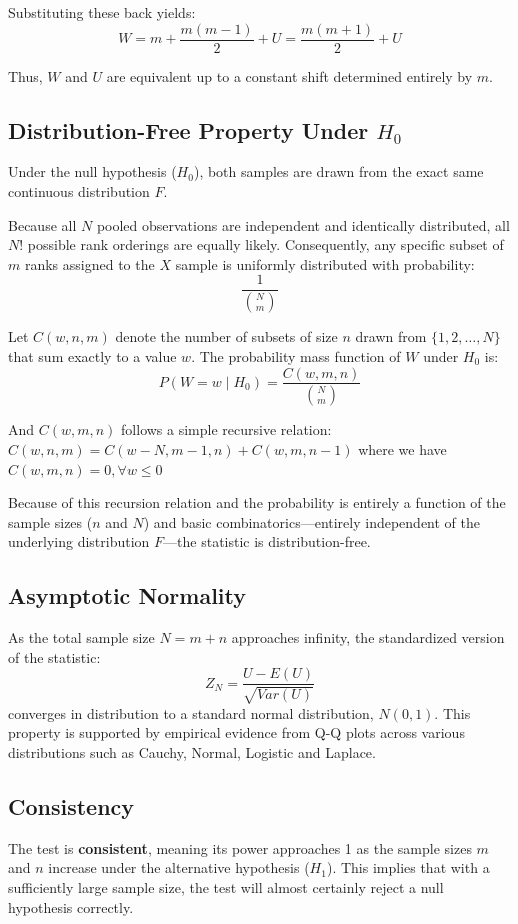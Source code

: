\documentclass[10pt]{article}
\begin{document}
Substituting these back yields:
$$W = m + \frac{m(m-1)}{2} + U = \frac{m(m+1)}{2} + U$$

Thus, $W$ and $U$ are equivalent up to a constant shift determined entirely by $m$.

\subsection{Distribution-Free Property Under $H_0$}

Under the null hypothesis ($H_0$), both samples are drawn from the exact same continuous distribution $F$. 

Because all $N$ pooled observations are independent and identically distributed, all $N!$ possible rank orderings are equally likely. Consequently, any specific subset of $m$ ranks assigned to the $X$ sample is uniformly distributed with probability:
$$\frac{1}{\binom{N}{m}}$$

Let $C(w, n, m)$ denote the number of subsets of size $n$ drawn from $\{1, 2, \dots, N\}$ that sum exactly to a value $w$. The probability mass function of $W$ under $H_0$ is:
$$P(W = w \mid H_0) = \frac{C(w, m, n)}{\binom{N}{m}}$$

And $C(w, m, n)$ follows a simple recursive relation: $C(w, n, m) = C(w-N, m-1, n) + C(w, m, n-1)$ where we have $C(w, m, n) = 0,  \forall  w \le 0$

Because of this recursion relation and the probability is entirely a function of the sample sizes ($n$ and $N$) and basic combinatorics—entirely independent of the underlying distribution $F$—the statistic is distribution-free.

\subsection{Asymptotic Normality}
As the total sample size $N = m + n$ approaches infinity, the standardized version of the statistic:
\begin{equation}
    Z_N = \frac{U - E(U)}{\sqrt{Var(U)}}
\end{equation}
converges in distribution to a standard normal distribution, $N(0, 1)$. This property is supported by empirical evidence from Q-Q plots across various distributions such as Cauchy, Normal, Logistic and Laplace.

\subsection{Consistency}
The test is \textbf{consistent}, meaning its power approaches 1 as the sample sizes $m$ and $n$ increase under the alternative hypothesis ($H_1$). This implies that with a sufficiently large sample size, the test will almost certainly reject a null hypothesis correctly.
\end{document}
